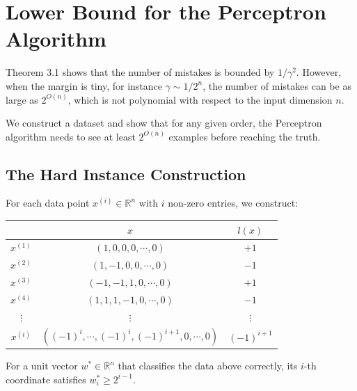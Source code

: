 \documentclass[main.tex]{subfiles}
\begin{document}
\needspace{0.33\textheight}
\section{Lower Bound for the Perceptron Algorithm}

Theorem 3.1 shows that the number of mistakes is bounded by $1/\gamma^2$. However, when the margin is tiny, for instance $\gamma \sim 1/2^n$, the number of mistakes can be as large as $2^{O(n)}$, which is not polynomial with respect to the input dimension $n$.

We construct a dataset and show that for any given order, the Perceptron algorithm needs to see at least $2^{O(n)}$ examples before reaching the truth.

\subsection{The Hard Instance Construction}

For each data point $x^{(i)} \in \mathbb{R}^n$ with $i$ non-zero entries, we construct:

\begin{center}
\begin{tabular}{ccc}
\hline
& $x$ & $l(x)$ \\
\hline
$x^{(1)}$ & $(1, 0, 0, 0, \cdots, 0)$ & $+1$ \\
$x^{(2)}$ & $(1, -1, 0, 0, \cdots, 0)$ & $-1$ \\
$x^{(3)}$ & $(-1, -1, 1, 0, \cdots, 0)$ & $+1$ \\
$x^{(4)}$ & $(1, 1, 1, -1, 0, \cdots, 0)$ & $-1$ \\
$\vdots$ & $\vdots$ & $\vdots$ \\
$x^{(i)}$ & $((-1)^i, \cdots, (-1)^i, (-1)^{i+1}, 0, \cdots, 0)$ & $(-1)^{i+1}$ \\
\hline
\end{tabular}
\end{center}

\begin{lemma}
For a unit vector $w^* \in \mathbb{R}^n$ that classifies the data above correctly, its $i$-th coordinate satisfies $w^*_i \geq 2^{i-1}$.
\end{lemma}
\end{document}
